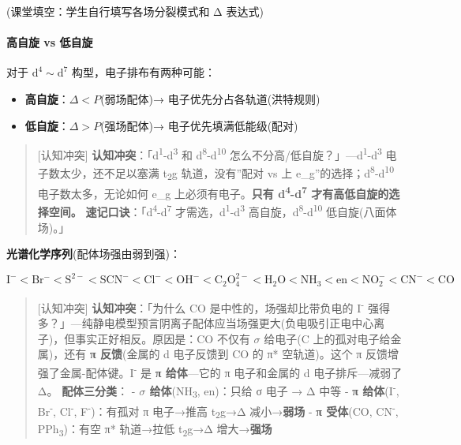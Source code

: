 (课堂填空：学生自行填写各场分裂模式和 Δ 表达式)

\paragraph{高自旋 vs 低自旋}\label{ux9ad8ux81eaux65cb-vs-ux4f4eux81eaux65cb}

对于 \(\mathrm{d^4 \sim d^7}\) 构型，电子排布有两种可能：

\begin{itemize}
\tightlist
\item
  \textbf{高自旋}：\(\Delta < P\)(弱场配体)→ 电子优先分占各轨道(洪特规则)
\item
  \textbf{低自旋}：\(\Delta > P\)(强场配体)→ 电子优先填满低能级(配对)
\end{itemize}

\begin{quote}
{[}认知冲突{]} \textbf{认知冲突}：「d\textsuperscript{1}-d\textsuperscript{3} 和 d\textsuperscript{8}-d\textsuperscript{10} 怎么不分高/低自旋？」---d\textsuperscript{1}-d\textsuperscript{3} 电子数太少，还不足以塞满 t\textsubscript{2}g 轨道，没有''配对 vs 上 e\_g''的选择；d\textsuperscript{8}-d\textsuperscript{10} 电子数太多，无论如何 e\_g 上必须有电子。\textbf{只有 d\textsuperscript{4}-d\textsuperscript{7} 才有高低自旋的选择空间。}
\textbf{速记口诀}：「d\textsuperscript{4}-d\textsuperscript{7} 才需选，d\textsuperscript{1}-d\textsuperscript{3} 高自旋，d\textsuperscript{8}-d\textsuperscript{10} 低自旋(八面体场)。」
\end{quote}

\textbf{光谱化学序列}(配体场强由弱到强)：

\[
\mathrm{I^- < Br^- < S^{2-} < SCN^- < Cl^- < OH^- < C_2O_4^{2-} < H_2O < NH_3 < en < NO_2^- < CN^- < CO}
\]

\begin{quote}
{[}认知冲突{]} \textbf{认知冲突}：「为什么 CO 是中性的，场强却比带负电的 I\textsuperscript{-} 强得多？」---纯静电模型预言阴离子配体应当场强更大(负电吸引正电中心离子)，但事实正好相反。原因是：CO 不仅有 \(\sigma\) 给电子(C 上的孤对电子给金属)，还有 \textbf{π 反馈}(金属的 d 电子反馈到 CO 的 π* 空轨道)。这个 π 反馈增强了金属-配体键。I\textsuperscript{-} 是 \textbf{π 给体}---它的 π 电子和金属的 d 电子排斥---减弱了 Δ。
\textbf{配体三分类}：
- \textbf{\(\sigma\) 给体}(NH\textsubscript{3}, en)：只给 σ 电子 → Δ 中等
- \textbf{π 给体}(I\textsuperscript{-}, Br\textsuperscript{-}, Cl\textsuperscript{-}, F\textsuperscript{-})：有孤对 π 电子→推高 t\textsubscript{2}g→Δ 减小→\textbf{弱场}
- \textbf{π 受体}(CO, CN\textsuperscript{-}, PPh\textsubscript{3})：有空 π* 轨道→拉低 t\textsubscript{2}g→Δ 增大→\textbf{强场}
\end{quote}

